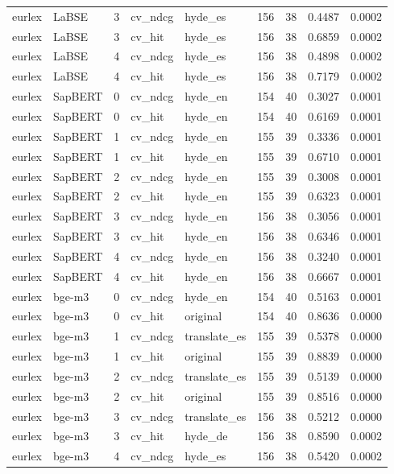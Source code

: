 \begin{tabular}{llrllrrrr}
eurlex & LaBSE & 3 & cv\_ndcg & hyde\_es & 156 & 38 & 0.4487 & 0.0002 \\
eurlex & LaBSE & 3 & cv\_hit & hyde\_es & 156 & 38 & 0.6859 & 0.0002 \\
eurlex & LaBSE & 4 & cv\_ndcg & hyde\_es & 156 & 38 & 0.4898 & 0.0002 \\
eurlex & LaBSE & 4 & cv\_hit & hyde\_es & 156 & 38 & 0.7179 & 0.0002 \\
eurlex & SapBERT & 0 & cv\_ndcg & hyde\_en & 154 & 40 & 0.3027 & 0.0001 \\
eurlex & SapBERT & 0 & cv\_hit & hyde\_en & 154 & 40 & 0.6169 & 0.0001 \\
eurlex & SapBERT & 1 & cv\_ndcg & hyde\_en & 155 & 39 & 0.3336 & 0.0001 \\
eurlex & SapBERT & 1 & cv\_hit & hyde\_en & 155 & 39 & 0.6710 & 0.0001 \\
eurlex & SapBERT & 2 & cv\_ndcg & hyde\_en & 155 & 39 & 0.3008 & 0.0001 \\
eurlex & SapBERT & 2 & cv\_hit & hyde\_en & 155 & 39 & 0.6323 & 0.0001 \\
eurlex & SapBERT & 3 & cv\_ndcg & hyde\_en & 156 & 38 & 0.3056 & 0.0001 \\
eurlex & SapBERT & 3 & cv\_hit & hyde\_en & 156 & 38 & 0.6346 & 0.0001 \\
eurlex & SapBERT & 4 & cv\_ndcg & hyde\_en & 156 & 38 & 0.3240 & 0.0001 \\
eurlex & SapBERT & 4 & cv\_hit & hyde\_en & 156 & 38 & 0.6667 & 0.0001 \\
eurlex & bge-m3 & 0 & cv\_ndcg & hyde\_en & 154 & 40 & 0.5163 & 0.0001 \\
eurlex & bge-m3 & 0 & cv\_hit & original & 154 & 40 & 0.8636 & 0.0000 \\
eurlex & bge-m3 & 1 & cv\_ndcg & translate\_es & 155 & 39 & 0.5378 & 0.0000 \\
eurlex & bge-m3 & 1 & cv\_hit & original & 155 & 39 & 0.8839 & 0.0000 \\
eurlex & bge-m3 & 2 & cv\_ndcg & translate\_es & 155 & 39 & 0.5139 & 0.0000 \\
eurlex & bge-m3 & 2 & cv\_hit & original & 155 & 39 & 0.8516 & 0.0000 \\
eurlex & bge-m3 & 3 & cv\_ndcg & translate\_es & 156 & 38 & 0.5212 & 0.0000 \\
eurlex & bge-m3 & 3 & cv\_hit & hyde\_de & 156 & 38 & 0.8590 & 0.0002 \\
eurlex & bge-m3 & 4 & cv\_ndcg & hyde\_es & 156 & 38 & 0.5420 & 0.0002 \\

\end{tabular}
